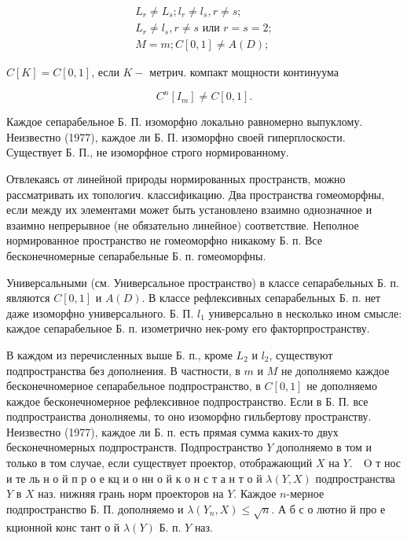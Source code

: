 \documentclass[10pt]{article}
\begin{document}
\[

\begin{gathered}

L_{r} \neq L_{s} ; l_{r} \neq l_{s}, r \neq s ; \\

L_{r} \neq l_{s}, r \neq s \text { или } r=s=2 ; \\

M=m ; C[0,1] \neq A(D) ;

\end{gathered}

\]



$C[K]=C[0,1]$, если $K-$ метрич. компакт мощности континуума



\[

C^{n}\left[I_{m}\right] \neq C[0,1] .

\]



Каждое сепарабельное Б. П. изоморфно локально равномерно выпуклому. Неизвестно (1977), каждое ли Б. П. изоморфно своей гиперплоскости. Существует Б. П., не изоморфное строго нормированному.



Отвлекаясь от линейной природы нормированных пространств, можно рассматривать их топологич. классификацию. Два пространства гомеоморфны, если между их элементами может быть установлено взаимно однозначное и взаимно непрерывное (не обязательно линейное) соответствие. Неполное нормированное пространство не гомеоморфно никакому Б. п. Все бесконечномерные сепарабельные Б. п. гомеоморфны.



Универсальными (см. Универсальное пространство) в классе сепарабельных Б. п. являются $C[0,1]$ и $A(D)$. В классе рефлексивных сепарабельных Б. п. нет даже изоморфно универсального. Б. П. $l_{1}$ универсально в несколько ином смысле: каждое сепарабельное Б. п. изометрично нек-рому его факторпространству.



В каждом из перечисленных выше Б. п., кроме $L_{2}$ и $l_{2}$, существуют подпространства без дополнения. В частности, в $m$ и $M$ не дополняемо каждое бесконечномерное сепарабельное подпространство, в $C[0,1]$ не дополняемо каждое бесконечномерное рефлексивное подпространство. Если в Б. П. все подпространства донолняемы, то оно изоморфно гильбертову пространству. Неизвестно (1977), каждое ли Б. п. есть прямая сумма каких-то двух бесконечномерных подпространств. Подпространство $Y$ дополняемо в том и только в том случае, если существует проектор, отображающий $X$ на $Y . \quad \mathrm{O}$ т нос и те ль н о й п р о е кц и о нн о й к о н с т а н т о й $\lambda(Y, X)$ подпространства $Y$ в $X$ наз. нижняя грань норм проекторов на $Y$. Каждое $n$-мерное подпространство Б. П. дополняемо и $\lambda\left(Y_{n}, X\right) \leqslant \sqrt{n}$. А б с о лютно й про е кционной конс тант о й $\lambda(Y)$ Б. п. $Y$ наз.
\end{document}
